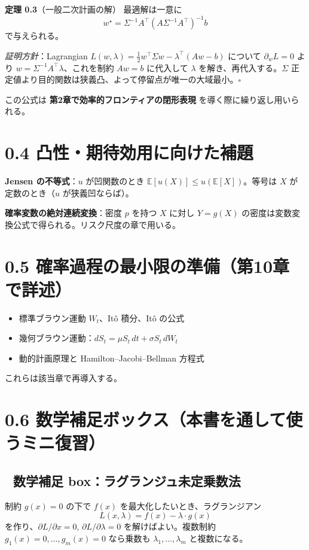 \documentclass[11pt,a4paper]{report}
\begin{document}
\textbf{定理 0.3}（一般二次計画の解） 最適解は一意に \[ w^\star = \Sigma^{-1} A^\top (A \Sigma^{-1} A^\top)^{-1} b \] で与えられる。

\emph{証明方針}：Lagrangian $L(w, \lambda) = \tfrac{1}{2} w^\top \Sigma w - \lambda^\top (Aw - b)$ について $\partial_w L = 0$ より $w = \Sigma^{-1} A^\top \lambda$、これを制約 $Aw = b$ に代入して $\lambda$ を解き、再代入する。$\Sigma$ 正定値より目的関数は狭義凸、よって停留点が唯一の大域最小。$\square$

この公式は \textbf{第2章で効率的フロンティアの閉形表現} を導く際に繰り返し用いられる。

\section{0.4 凸性・期待効用に向けた補題}

\textbf{Jensen の不等式}：$u$ が凹関数のとき $\mathbb{E}[u(X)] \le u(\mathbb{E}[X])$。等号は $X$ が定数のとき（$u$ が狭義凹ならば）。

\textbf{確率変数の絶対連続変換}：密度 $p$ を持つ $X$ に対し $Y = g(X)$ の密度は変数変換公式で得られる。リスク尺度の章で用いる。

\section{0.5 確率過程の最小限の準備（第10章で詳述）}

\begin{itemize}
\item 標準ブラウン運動 $W_t$、Itô 積分、Itô の公式
\item 幾何ブラウン運動：$dS_t = \mu S_t \, dt + \sigma S_t \, dW_t$
\item 動的計画原理と Hamilton–Jacobi–Bellman 方程式
\end{itemize}

これらは該当章で再導入する。

\section{0.6 数学補足ボックス（本書を通して使うミニ復習）}

\subsection{📐 数学補足 box：ラグランジュ未定乗数法}

制約 $g(x) = 0$ の下で $f(x)$ を最大化したいとき、ラグランジアン \[ L(x, \lambda) = f(x) - \lambda \cdot g(x) \] を作り、$\partial L / \partial x = 0$, $\partial L / \partial \lambda = 0$ を解けばよい。複数制約 $g_1(x) = 0, \dots, g_m(x) = 0$ なら乗数も $\lambda_1, \dots, \lambda_m$ と複数になる。
\end{document}
